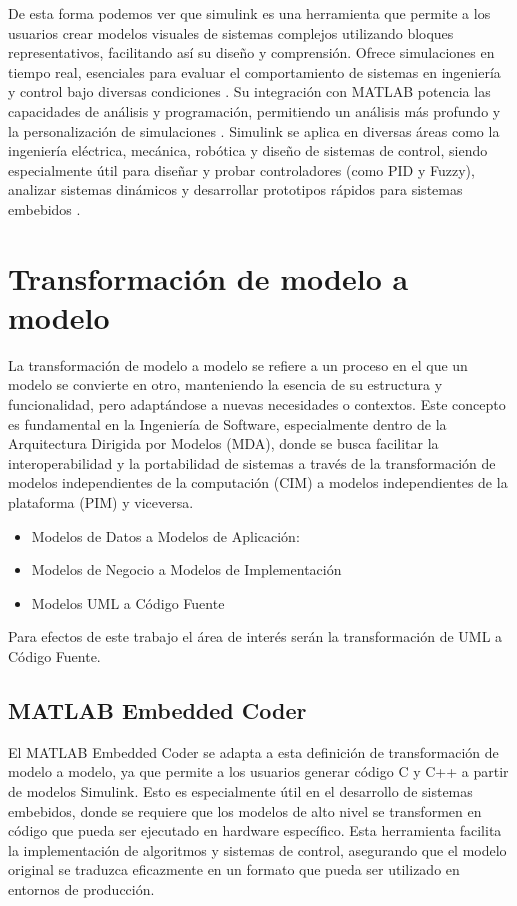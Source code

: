 De esta forma podemos ver que simulink es una herramienta que permite a los usuarios crear modelos visuales de sistemas complejos utilizando bloques representativos, facilitando así su diseño y comprensión. Ofrece simulaciones en tiempo real, esenciales para evaluar el comportamiento de sistemas en ingeniería y control bajo diversas condiciones \cite{PealozaLuna2022SimulacinDU}. Su integración con MATLAB potencia las capacidades de análisis y programación, permitiendo un análisis más profundo y la personalización de simulaciones \cite{Daza2021PlataformaDP}. Simulink se aplica en diversas áreas como la ingeniería eléctrica, mecánica, robótica y diseño de sistemas de control, siendo especialmente útil para diseñar y probar controladores (como PID y Fuzzy), analizar sistemas dinámicos y desarrollar prototipos rápidos para sistemas embebidos \cite*{CardozoSarmiento2019SimulationOI}.

\section{Transformación de modelo a modelo}

La transformación de modelo a modelo se refiere a un proceso en el que un modelo se convierte en otro, manteniendo la esencia de su estructura y funcionalidad, 
pero adaptándose a nuevas necesidades o contextos. Este concepto es fundamental en la Ingeniería de Software, especialmente dentro de la Arquitectura Dirigida 
por Modelos (MDA), donde se busca facilitar la interoperabilidad y la portabilidad de sistemas a través de la transformación de modelos independientes de la computación 
(CIM) a modelos independientes de la plataforma (PIM) y viceversa.

\begin{itemize}
    \item Modelos de Datos a Modelos de Aplicación:
    \item Modelos de Negocio a Modelos de Implementación
    \item Modelos UML a Código Fuente
\end{itemize}

Para efectos de este trabajo el área de interés serán la transformación de UML a Código Fuente.

\subsection{MATLAB Embedded Coder}

El MATLAB Embedded Coder se adapta a esta definición de transformación de modelo a modelo, ya que permite a los usuarios generar código C y C++ a partir de modelos 
Simulink. Esto es especialmente útil en el desarrollo de sistemas embebidos, donde se requiere que los modelos de alto nivel se transformen en código 
que pueda ser ejecutado en hardware específico. Esta herramienta facilita la implementación de algoritmos y sistemas de control, asegurando que el modelo original 
se traduzca eficazmente en un formato que pueda ser utilizado en entornos de producción.

